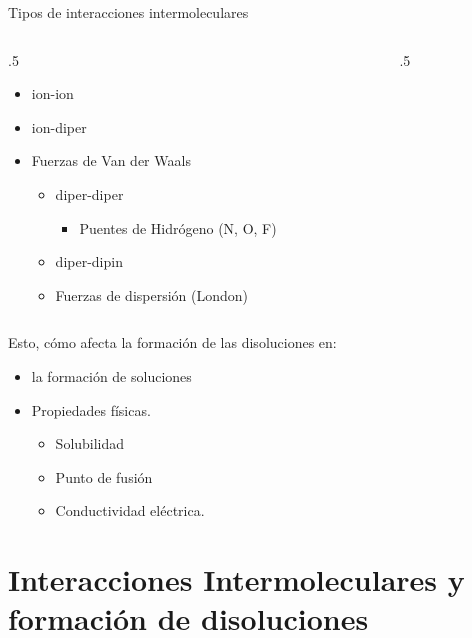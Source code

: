 \documentclass[11pt, aspectratio=169, xcolor=table]{beamer}
\begin{document}
\begin{frame}{Tipos de interacciones intermoleculares}
  \begin{columns}
    \begin{column}{.5\textwidth}
      \begin{itemize}[<+->]
        \item ion-ion
        \item ion-diper
        \item Fuerzas de Van der Waals
              \begin{itemize}
                \item diper-diper
                      \begin{itemize}
                        \item Puentes de Hidrógeno (N, O, F) 
                      \end{itemize}
                \item diper-dipin
                \item Fuerzas de dispersión (London)
              \end{itemize}
      \end{itemize}
    \end{column}
    \begin{column}{.5\textwidth}
    \end{column}
  \end{columns}
\end{frame}

\begin{frame}{Esto, cómo afecta la formación de las disoluciones en:}
  \begin{itemize}[<+->]
	\item la formación de soluciones
	\item Propiedades físicas.
          \begin{itemize}[<+->]
            \item Solubilidad
            \item Punto de fusión
            \item Conductividad eléctrica.
          \end{itemize}
  \end{itemize}
\end{frame}

\section{Interacciones Intermoleculares y formación de disoluciones}
\end{document}
